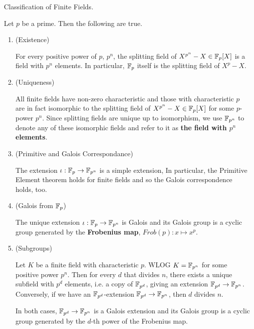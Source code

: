 \documentclass[../book.tex]{subfiles}
\begin{document}
\begin{thm} Classification of Finite Fields.
    
    Let $p$ be a prime. Then the following are true. 
    \begin{enumerate}
        \item (Existence)
        
        For every positive power of $p$, $p^n$, 
        the splitting field of $X^{p^n} - X \in \mathbb{F}_p[X]$
        is a field with $p^n$ elements.
        In particular, $\mathbb{F}_p$ itself is the splitting field of $X^p - X$. 
        \item (Uniqueness)
        
        All finite fields have non-zero characteristic and 
        those with characteristic $p$ are in fact isomorphic to
        the splitting field of $X^{p^n} - X \in \mathbb{F}_p[X]$ for some $p$-power $p^n$. 
        Since splitting fields are unique up to isomorphism,
        we use $\mathbb{F}_{p^n}$ to denote any of these isomorphic fields
        and refer to it as \textbf{the field with $p^n$ elements}. 
        \item (Primitive and Galois Correspondance)
        
        The extension $\iota : \mathbb{F}_p \to \mathbb{F}_{p^n}$ is a simple extension,
        In particular, the Primitive Element theorem holds for finite fields
        and so the Galois correspondence holds, too. 
        \item (Galois from $\mathbb{F}_p$)
        
        The unique extension $\iota : \mathbb{F}_p \to \mathbb{F}_{p^n}$ is Galois and 
        its Galois group is a cyclic group generated by 
        the \textbf{Frobenius map}, $Frob(p) : x \mapsto x^p$. 
        \item (Subgroups)
        
        Let $K$ be a finite field with characteristic $p$. 
        WLOG $K = \mathbb{F}_{p^n}$ for some positive power $p^n$. 
        Then for every $d$ that divides $n$, 
        there exists a unique subfield with $p^d$ elements, 
        i.e. a copy of $\mathbb{F}_{p^d}$, giving an extension $\mathbb{F}_{p^d} \to \mathbb{F}_{p^n}$.
        Conversely, if we have an $\mathbb{F}_{p^d}$-extension $\mathbb{F}_{p^d} \to \mathbb{F}_{p^n}$,
        then $d$ divides $n$. 
        
        In both cases, 
        $\mathbb{F}_{p^d} \to \mathbb{F}_{p^n}$ is a Galois extension and 
        its Galois group is a cyclic group generated by 
        the $d$-th power of the Frobenius map. 
    \end{enumerate}
    
\end{thm}
\end{document}
